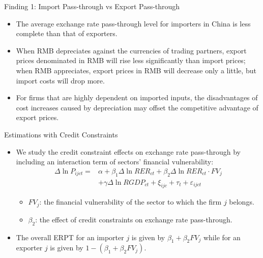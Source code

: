 \documentclass[10pt]{beamer}
\begin{document}
\begin{frame}{Finding 1: Import Pass-through vs Export Pass-through}
	\begin{tcolorbox}[colback=blue!5!white, colframe=blue!75!black,title=Key Finding 1]
		\begin{itemize}
			\item The average exchange rate pass-through level for importers in China is less complete than that of exporters.
		\end{itemize}
	\end{tcolorbox}
	\begin{itemize}
		\item When RMB depreciates against the currencies of trading partners, export prices denominated in RMB will rise less significantly than import prices; when RMB appreciates, export prices in RMB will decrease only a little, but import costs will drop more.
		\item For firms that are highly dependent on imported inputs, the disadvantages of cost increases caused by depreciation may offset the competitive advantage of export prices.
	\end{itemize}
\end{frame}

\begin{frame}{Estimations with Credit Constraints}
	\begin{itemize}
		\item We study the credit constraint effects on exchange rate pass-through by including an interaction term of sectors’ financial vulnerability:
		\begin{equation}
			\begin{aligned}
				\Delta \ln P_{ijct}=&\alpha+\beta_{1} \Delta \ln RER_{ct}+\beta_{2} \Delta \ln RER_{ct} \cdot FV_{j} \\ &+\gamma \Delta \ln RGDP_{ct}+\xi_{ijc}+\tau_{t} +\varepsilon_{ijct}
			\end{aligned}
			\label{eq.credit}
		\end{equation}
		\begin{itemize}
		    \item $FV_{j}$: the financial vulnerability of the sector to which the firm $j$ belongs.
                \item $\beta_2$: the effect of credit constraints on exchange rate pass-through.
		\end{itemize}
		\item The overall ERPT for an importer $j$ is given by $\beta_{1} +\beta_{2} FV_j$ while for an exporter $j$ is given by $1-(\beta_{1} +\beta_{2} FV_j)$.
	\end{itemize}
\end{frame}
\end{document}
